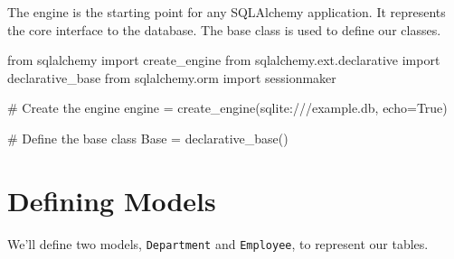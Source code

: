 \documentclass[
  letterpaper,
  DIV=11,
  numbers=noendperiod]{scrreprt}
\newenvironment{Shaded}{\begin{snugshade}}{\end{snugshade}}
\newcommand{\CommentTok}[1]{\textcolor[rgb]{0.37,0.37,0.37}{#1}}
\newcommand{\ImportTok}[1]{\textcolor[rgb]{0.00,0.46,0.62}{#1}}
\newcommand{\NormalTok}[1]{\textcolor[rgb]{0.00,0.23,0.31}{#1}}
\newcommand{\OperatorTok}[1]{\textcolor[rgb]{0.37,0.37,0.37}{#1}}
\newcommand{\StringTok}[1]{\textcolor[rgb]{0.13,0.47,0.30}{#1}}
\newcommand{\VariableTok}[1]{\textcolor[rgb]{0.07,0.07,0.07}{#1}}
\begin{document}
The engine is the starting point for any SQLAlchemy application. It
represents the core interface to the database. The base class is used to
define our classes.

\begin{Shaded}
\begin{Highlighting}[]
\ImportTok{from}\NormalTok{ sqlalchemy }\ImportTok{import}\NormalTok{ create\_engine}
\ImportTok{from}\NormalTok{ sqlalchemy.ext.declarative }\ImportTok{import}\NormalTok{ declarative\_base}
\ImportTok{from}\NormalTok{ sqlalchemy.orm }\ImportTok{import}\NormalTok{ sessionmaker}

\CommentTok{\# Create the engine}
\NormalTok{engine }\OperatorTok{=}\NormalTok{ create\_engine(}\StringTok{\textquotesingle{}sqlite:///example.db\textquotesingle{}}\NormalTok{, echo}\OperatorTok{=}\VariableTok{True}\NormalTok{)}

\CommentTok{\# Define the base class}
\NormalTok{Base }\OperatorTok{=}\NormalTok{ declarative\_base()}
\end{Highlighting}
\end{Shaded}

\section{Defining Models}\label{defining-models}

We'll define two models, \texttt{Department} and \texttt{Employee}, to
represent our tables.
\end{document}
